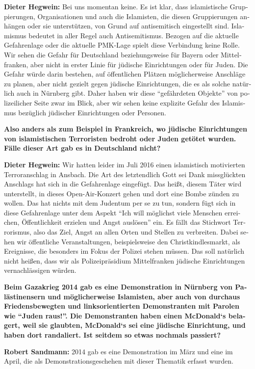 \begin{otherlanguage}{ngerman}
\textbf{Dieter Hegwein:} Bei uns momentan keine. Es ist klar, dass islamistische Gruppierungen, Organisationen und auch die Islamisten, die diesen Gruppierungen anhängen oder sie unterstützen, von Grund auf antisemitisch eingestellt sind. Islamismus bedeutet in aller Regel auch Antisemitismus. Bezogen auf die aktuelle Gefahrenlage oder die aktuelle PMK-Lage spielt diese Verbindung keine Rolle. Wir sehen die Gefahr für Deutschland beziehungsweise für Bayern oder Mittelfranken, aber nicht in erster Linie für jüdische Einrichtungen oder für Juden. Die Gefahr würde darin bestehen, auf öffentlichen Plätzen möglicherweise Anschläge zu planen, aber nicht gezielt gegen jüdische Einrichtungen, die es als solche natürlich auch in Nürnberg gibt. Daher haben wir diese "`gefährdeten Objekte"' von polizeilicher Seite zwar im Blick, aber wir sehen keine explizite Gefahr des Islamismus bezüglich jüdischer Einrichtungen oder Personen.

\textbf{Also anders als zum Beispiel in Frankreich, wo jüdische Einrichtungen von islamistischen Terroristen bedroht oder Juden getötet wurden. Fälle dieser Art gab es in Deutschland nicht?}

\textbf{Dieter Hegwein:} Wir hatten leider im Juli 2016 einen islamistisch motivierten Terroranschlag in Ansbach. Die Art des letztendlich Gott sei Dank missglückten Anschlags hat sich in die Gefahrenlage eingefügt. Das heißt, diesem Täter wird unterstellt, in dieses Open-Air-Konzert gehen und dort eine Bombe zünden zu wollen. Das hat nichts mit dem Judentum per se zu tun, sondern fügt sich in diese Gefahrenlage unter dem Aspekt "`Ich will möglichst viele Menschen erreichen, Öffentlichkeit erzielen und Angst auslösen"' ein. Es fällt das Stichwort Terrorismus, also das Ziel, Angst an allen Orten und Stellen zu verbreiten. Dabei sehen wir öffentliche Veranstaltungen, beispielsweise den Christkindlesmarkt, als Ereignisse, die besonders im Fokus der Polizei stehen müssen. Das soll natürlich nicht heißen, dass wir als Polizeipräsidium Mittelfranken jüdische Einrichtungen vernachlässigen würden.

\textbf{Beim Gazakrieg 2014 gab es eine Demonstration in Nürnberg von Palästinensern und möglicherweise Islamisten, aber auch von durchaus Friedensbewegten und linksorientierten Demonstranten mit Parolen wie "`Juden raus!"'. Die Demonstranten haben einen McDonald‘s belagert, weil sie glaubten, McDonald‘s sei eine jüdische Einrichtung, und haben dort randaliert. Ist seitdem so etwas nochmals passiert?}

\textbf{Robert Sandmann:} 2014 gab es eine Demonstration im März und eine im April, die als Demonstrationsgeschehen mit dieser Thematik erfasst wurden.


\end{otherlanguage}
